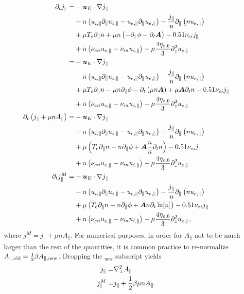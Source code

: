 \begin{align*}
 \partial_t j_\|
=&
- \boldsymbol{u}_E \cdot \nabla j_\|
    \\&
    - n \left( u_{i, \|}  \partial_\| u_{i,\|} - u_{e, \|} \partial_\| u_{e,\|} \right)
    - \frac{j_\|}{n}\partial_\|\left(n u_{e,\|} \right)
    \\&
    + \mu T_e\partial_\| n
    + \mu n\left(-\partial_\| \phi - \partial_t \boldsymbol{A}\right)
    - 0.51 \nu_{ei} j_\|
    \\ &
    + n \left(\nu_{e n}u_{e,\|}-\nu_{i n}u_{i,\|} \right)
    - \mu \frac{4\eta_{e,0}}{3} \partial_z^2 u_{e,\|}
 \\
=&
- \boldsymbol{u}_E \cdot \nabla j_\|
    \\&
    - n \left( u_{i, \|}  \partial_\| u_{i,\|} - u_{e, \|} \partial_\| u_{e,\|} \right)
    - \frac{j_\|}{n}\partial_\|\left(n u_{e,\|} \right)
    \\&
    + \mu T_e\partial_\| n
    - \mu n\partial_\| \phi
    - \partial_t\left(\mu n \boldsymbol{A}\right)
    + \mu\boldsymbol{A}\partial_t n
    - 0.51 \nu_{ei} j_\|
    \\ &
    + n \left(\nu_{e n}u_{e,\|}-\nu_{i n}u_{i,\|} \right)
    - \mu \frac{4\eta_{e,0}}{3} \partial_z^2 u_{e,\|}
 \\
 \partial_t \left(j_\|+ \mu n A_\| \right)
=&
- \boldsymbol{u}_E \cdot \nabla j_\|
    \\&
    - n \left( u_{i, \|}  \partial_\| u_{i,\|} - u_{e, \|} \partial_\| u_{e,\|} \right)
    - \frac{j_\|}{n}\partial_\|\left(n u_{e,\|} \right)
    \\&
    + \mu
    \left( T_e\partial_\| n
    -  n\partial_\| \phi
    + \boldsymbol{A}\frac{n}{n}\partial_t n
    \right)
    - 0.51 \nu_{ei} j_\|
    \\ &
    + n \left(\nu_{e n}u_{e,\|}-\nu_{i n}u_{i,\|} \right)
    - \mu \frac{4\eta_{e,0}}{3} \partial_z^2 u_{e,\|}
 \\
 \partial_t j^M_\|
=&
- \boldsymbol{u}_E \cdot \nabla j_\|
    \\&
    - n \left( u_{i, \|}  \partial_\| u_{i,\|} - u_{e, \|} \partial_\| u_{e,\|} \right)
    - \frac{j_\|}{n}\partial_\|\left(n u_{e,\|} \right)
    \\&
    + \mu
    \left( T_e\partial_\| n
    -  n\partial_\| \phi
    + \boldsymbol{A}n\partial_t \ln[n]
    \right)
    - 0.51 \nu_{ei} j_\|
    \\ &
    + n \left(\nu_{e n}u_{e,\|}-\nu_{i n}u_{i,\|} \right)
    - \mu \frac{4\eta_{e,0}}{3} \partial_z^2 u_{e,\|},
\end{align*}
%
where $j^M_\| = j_\|+ \mu n A_\|$.
%
For numerical purposes, in order for $A_\|$ not to be much larger than the rest of the quantities, it is common practice to re-normalize $A_{\|, \text{old}} = \frac{1}{2}\beta A_{\|, \text{new}}$.
Dropping the $_{\text{new}}$ subscript yields %
%
\begin{align*}
    j_\| =& \nabla^2_\perp A_\|\\
    j^M_\| =& j_\|+ \frac{1}{2}\beta\mu n A_\|.
\end{align*}
